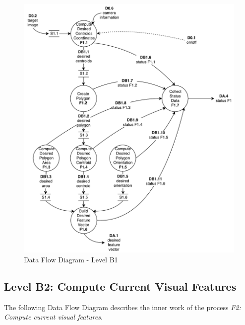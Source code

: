\begin{figure}[!htb]
	\centering
	\includegraphics[width=\textwidth]{content/chapter_03/images/sa_diagram_03.pdf}
	\caption{Data Flow Diagram - Level B1}
	\label{fig:sa_diag_03}
\end{figure}

\pagebreak

\subsection{Level B2: Compute Current Visual Features}
\label{sec:level-B2}

The following Data Flow Diagram describes the inner work of the process \textit{F2: Compute current visual features}.

